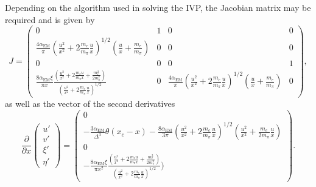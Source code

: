 Depending on the algorithm used in solving the IVP, the Jacobian matrix may be required and is given by
\begin{equation}
    J = \begin{pmatrix}
         0 & 1 & 0 & 0 \\ \frac{4\alpha_\mathrm{EM} }{\pi}\left( \frac{u^2}{x^2} + 2\frac{m_e}{m_\pi}\frac{u}{x} \right)^{1/2}\left( \frac{u}{x} + \frac{m_e}{m_\pi} \right) & 0 & 0 & 0 \\ 0 & 0 & 0 & 1 \\ \frac{8\alpha_\mathrm{EM} \xi }{\pi x}\frac{\left( \frac{u^2}{x^2} + 2\frac{m_e u}{m_\pi x} +\frac{m_e^2}{2m_\pi^2} \right)}{\left( \frac{u^2}{x^2} + 2\frac{m_e}{m_\pi}\frac{u}{x} \right)^{1/2} } & 0 & \frac{4\alpha_\mathrm{EM} }{\pi}\left( \frac{u^2}{x^2} + 2\frac{m_e}{m_\pi}\frac{u}{x} \right)^{1/2}\left( \frac{u}{x} + \frac{m_e}{m_\pi} \right) & 0
    \end{pmatrix},
\end{equation}
as well as the vector of the second derivatives
\begin{equation}
    \frac{\partial}{\partial x}
    \begin{pmatrix}
        u' \\ v' \\ \xi' \\ \eta'
    \end{pmatrix}
    =
    \begin{pmatrix}
         0 \\ -\frac{3\alpha_\mathrm{EM} }{\Delta^3}\theta(x_c - x) - \frac{8 \alpha_\mathrm{EM} }{3 \pi}\left( \frac{u^2}{x^2} + 2\frac{m_e}{m_\pi}\frac{u}{x} \right)^{1/2} \left( \frac{u^2}{x^2} + \frac{m_e}{2 m_\pi}\frac{u}{x} \right) \\ 0 \\ -\frac{8\alpha_\mathrm{EM} \xi }{\pi x^2}\frac{\left( \frac{u^2}{x^2} + 2\frac{m_e u}{m_\pi x} +\frac{m_e^2}{2 m_\pi^2} \right)}{\left( \frac{u^2}{x^2} + 2\frac{m_e}{m_\pi}\frac{u}{x} \right)^{1/2} })
    \end{pmatrix}.
\end{equation}